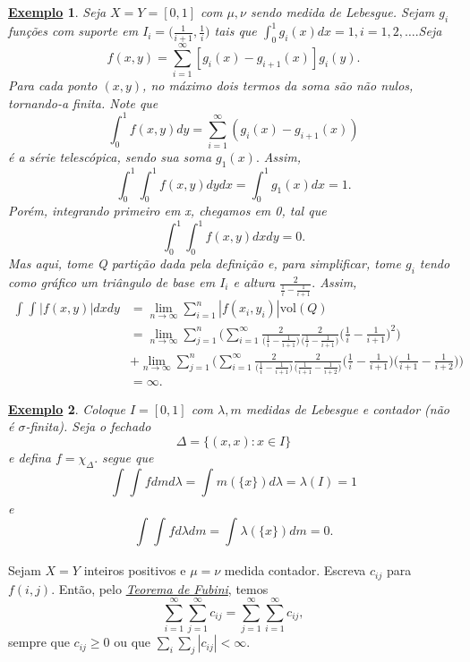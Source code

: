 \documentclass{article}
\newtheorem{example}{\underline{Exemplo}}
\begin{document}
 \begin{example}
   Seja \(X = Y = [0, 1]\) com \(\mu, \nu\) sendo medida de Lebesgue. Sejam \(g_{i}\) funções com suporte em \(I_{i} = \biggl(\frac{1}{i+1}, \frac{1}{i}\biggr)\) tais que \(\int_{0}^{1}g_{i}(x)dx = 1, i = 1, 2, \dotsc .\)Seja 
     \[
       f(x, y) = \sum\limits_{i=1}^{\infty}[g_{i}(x)-g_{i+1}(x)]g_{i}(y).
     \]
  Para cada ponto \((x, y)\), no máximo dois termos da soma são não nulos, tornando-a finita. Note que 
    \[
      \int_{0}^{1}f(x, y)dy = \sum\limits_{i=1}^{\infty}(g_{i}(x)-g_{i+1}(x))
    \]
  é a série telescópica, sendo sua soma \(g_1(x).\) Assim, 
    \[
      \int_{0}^{1}\int_{0}^{1}f(x, y)dydx = \int_{0}^{1}g_1(x)dx = 1.
    \]
  Porém, integrando primeiro em x, chegamos em 0, tal que 
    \[
      \int_{0}^{1}\int_{0}^{1}f(x, y)dxdy = 0.
    \]
  Mas aqui, tome Q partição dada pela definição e, para simplificar, tome \(g_{i}\) tendo como gráfico um triângulo de base em \(I_{i}\) e altura \(\frac{2}{\frac{1}{i}-\frac{1}{i+1}}.\) Assim, 
 \begin{align*}
   \int_{}^{}\int_{}^{}|f(x, y)|dxdy &= \lim_{n\to \infty}\sum\limits_{i=1}^{n}|f(x_{i}, y_{i})|\mathrm{vol}(Q) \\ 
                                     &= \lim_{n\to \infty}\sum\limits_{j=1}^{n}\biggl(\sum\limits_{i=1}^{\infty}\frac{2}{\biggl(\frac{1}{i}-\frac{1}{i+1}\biggr)}\frac{2}{\biggl(\frac{1}{i}-\frac{1}{i+1}\biggr)}\biggl(\frac{1}{i}-\frac{1}{i+1}\biggr)^{2}\biggr)\\
                                     &+ \lim_{n\to \infty}\sum\limits_{j=1}^{n}\biggl(\sum\limits_{i=1}^{\infty}\frac{2}{\biggl(\frac{1}{i}-\frac{1}{i+1}\biggr)}\frac{2}{\biggl(\frac{1}{i+1}-\frac{1}{i+2}\biggr)}\biggl(\frac{1}{i}-\frac{1}{i+1}\biggr)\biggl(\frac{1}{i+1}-\frac{1}{i+2}\biggr)\biggr)\\
                                     &= \infty.
 \end{align*}
 \end{example}
\begin{example}
  Coloque \(I=[0, 1]\) com \(\lambda , m\) medidas de Lebesgue e contador (não é \(\sigma \)-finita). Seja o fechado 
    \[
      \Delta = \{(x, x): x\in I\}
    \]
  e defina \(f=\chi_{\Delta }.\) segue que 
    \[
      \int_{}^{}\int_{}^{}fdmd\lambda = \int_{}^{}m(\{x\})d\lambda = \lambda (I) = 1
    \]
  e 
    \[
      \int_{}^{}\int_{}^{}fd\lambda dm = \int_{}^{}\lambda (\{x\})dm = 0.
    \]
\end{example}
  Sejam \(X = Y\) inteiros positivos e \(\mu  = \nu\) medida contador. Escreva \(c_{ij}\) para \(f(i, j).\) Então, pelo \hyperlink{fubini_tonelli}{\textit{Teorema de Fubini}}, temos 
    \[
      \sum\limits_{i=1}^{\infty}\sum\limits_{j=1}^{\infty}c_{ij} = \sum\limits_{j=1}^{\infty}\sum\limits_{i=1}^{\infty}c_{ij},
    \]
  sempre que \(c_{ij}\geq 0\) ou que \(\sum\limits_{i}^{}\sum\limits_{j}^{}|c_{ij}| < \infty\).
\end{document}
